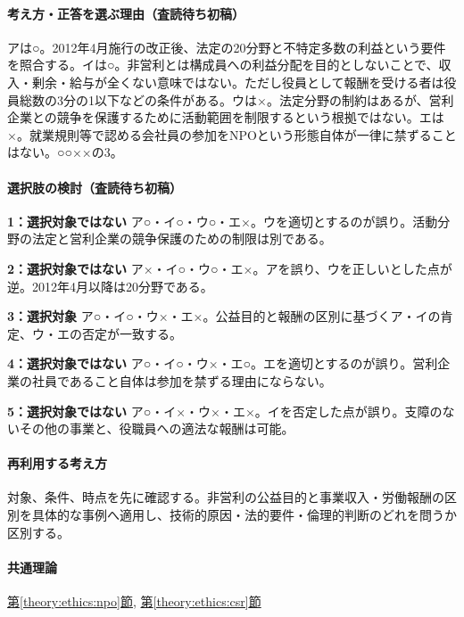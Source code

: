 \paragraph{考え方・正答を選ぶ理由（査読待ち初稿）} アは○。2012年4月施行の改正後、法定の20分野と不特定多数の利益という要件を照合する。イは○。非営利とは構成員への利益分配を目的としないことで、収入・剰余・給与が全くない意味ではない。ただし役員として報酬を受ける者は役員総数の3分の1以下などの条件がある。ウは×。法定分野の制約はあるが、営利企業との競争を保護するために活動範囲を制限するという根拠ではない。エは×。就業規則等で認める会社員の参加をNPOという形態自体が一律に禁ずることはない。○○××の3。

\paragraph{選択肢の検討（査読待ち初稿）}\mbox{}\par

\noindent\textbf{1：選択対象ではない} ア○・イ○・ウ○・エ×。ウを適切とするのが誤り。活動分野の法定と営利企業の競争保護のための制限は別である。\par

\noindent\textbf{2：選択対象ではない} ア×・イ○・ウ○・エ×。アを誤り、ウを正しいとした点が逆。2012年4月以降は20分野である。\par

\noindent\textbf{3：選択対象} ア○・イ○・ウ×・エ×。公益目的と報酬の区別に基づくア・イの肯定、ウ・エの否定が一致する。\par

\noindent\textbf{4：選択対象ではない} ア○・イ○・ウ×・エ○。エを適切とするのが誤り。営利企業の社員であること自体は参加を禁ずる理由にならない。\par

\noindent\textbf{5：選択対象ではない} ア○・イ×・ウ×・エ×。イを否定した点が誤り。支障のないその他の事業と、役職員への適法な報酬は可能。\par

\paragraph{再利用する考え方} 対象、条件、時点を先に確認する。非営利の公益目的と事業収入・労働報酬の区別を具体的な事例へ適用し、技術的原因・法的要件・倫理的判断のどれを問うか区別する。

\paragraph{共通理論} \hyperref[theory:ethics:npo]{第\ref*{theory:ethics:npo}節}, \hyperref[theory:ethics:csr]{第\ref*{theory:ethics:csr}節}

